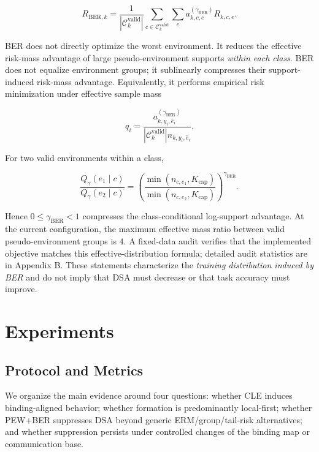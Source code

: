 \documentclass[10pt,twocolumn]{article}
\begin{document}
\[
R_{\mathrm{BER},k}
=
\frac1{|\mathcal C_k^{\mathrm{valid}}|}
\sum_{c\in\mathcal C_k^{\mathrm{valid}}}
\sum_e a^{(\gamma_{\mathrm{BER}})}_{k,c,e}R_{k,c,e}.
\]

BER does not directly optimize the worst environment. It reduces the effective risk-mass advantage of large pseudo-environment supports \emph{within each class}. BER does not equalize environment groups; it sublinearly compresses their support-induced risk-mass advantage. Equivalently, it performs empirical risk minimization under effective sample mass

\[
q_i=
\frac{a^{(\gamma_{\mathrm{BER}})}_{k,y_i,\hat e_i}}
{|\mathcal C_k^{\mathrm{valid}}|n_{k,y_i,\hat e_i}}.
\]

For two valid environments within a class,

\[
\frac{Q_\gamma(e_1\mid c)}{Q_\gamma(e_2\mid c)}
=
\left(
\frac{\min(n_{c,e_1},K_{\mathrm{cap}})}
{\min(n_{c,e_2},K_{\mathrm{cap}})}
\right)^{\gamma_{\mathrm{BER}}}.
\]

Hence \(0\le\gamma_{\mathrm{BER}}<1\) compresses the class-conditional log-support advantage. At the current configuration, the maximum effective mass ratio between valid pseudo-environment groups is \(4\). A fixed-data audit verifies that the implemented objective matches this effective-distribution formula; detailed audit statistics are in Appendix B. These statements characterize the \emph{training distribution induced by BER} and do not imply that DSA must decrease or that task accuracy must improve.

\section{Experiments}

\subsection{Protocol and Metrics}

We organize the main evidence around four questions: whether CLE induces binding-aligned behavior; whether formation is predominantly local-first; whether PEW+BER suppresses DSA beyond generic ERM/group/tail-risk alternatives; and whether suppression persists under controlled changes of the binding map or communication base.
\end{document}

